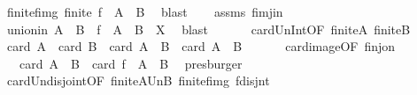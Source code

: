 \begin{isabellebody}
\ finite{\isacharunderscore}{\kern0pt}f{\isacharunderscore}{\kern0pt}img{\isacharcolon}{\kern0pt}\ {\isachardoublequoteopen}finite\ {\isacharparenleft}{\kern0pt}f\ {\isacharbackquote}{\kern0pt}\ {\isacharparenleft}{\kern0pt}A\ {\isasyminter}\ B{\isacharparenright}{\kern0pt}{\isacharparenright}{\kern0pt}{\isachardoublequoteclose}\ \isamarkupfalse%
\ blast\isanewline
\ \ \isamarkupfalse%
\ assms{\isacharparenleft}{\kern0pt}{}{\isacharparenright}{\kern0pt}\ f{\isacharunderscore}{\kern0pt}imj{\isacharunderscore}{\kern0pt}in\ \isamarkupfalse%
\ union{\isacharunderscore}{\kern0pt}in{\isacharcolon}{\kern0pt}\ {\isachardoublequoteopen}{\isacharparenleft}{\kern0pt}A\ {\isasymunion}\ B{\isacharparenright}{\kern0pt}\ {\isasymunion}\ f\ {\isacharbackquote}{\kern0pt}\ {\isacharparenleft}{\kern0pt}A\ {\isasyminter}\ B{\isacharparenright}{\kern0pt}\ {\isasymsubseteq}\ X{\isachardoublequoteclose}\ \isamarkupfalse%
\ blast\isanewline
\ \ \isanewline
\ \ \isamarkupfalse%
\ card{\isacharunderscore}{\kern0pt}Un{\isacharunderscore}{\kern0pt}Int{\isacharbrackleft}{\kern0pt}OF\ finite{\isacharunderscore}{\kern0pt}A\ finite{\isacharunderscore}{\kern0pt}B{\isacharbrackright}{\kern0pt}\ \isamarkupfalse%
\ {\isachardoublequoteopen}card\ A\ {\isacharplus}{\kern0pt}\ card\ B\ {\isacharequal}{\kern0pt}\ card\ {\isacharparenleft}{\kern0pt}A\ {\isasymunion}\ B{\isacharparenright}{\kern0pt}\ {\isacharplus}{\kern0pt}\ card\ {\isacharparenleft}{\kern0pt}A\ {\isasyminter}\ B{\isacharparenright}{\kern0pt}{\isachardoublequoteclose}\ \isacommand{{\isachardot}{\kern0pt}}\isamarkupfalse%
\isanewline
\ \ \isamarkupfalse%
\ \isamarkupfalse%
\ card{\isacharunderscore}{\kern0pt}image{\isacharbrackleft}{\kern0pt}OF\ f{\isacharunderscore}{\kern0pt}inj{\isacharunderscore}{\kern0pt}on{\isacharbrackright}{\kern0pt}\ \isamarkupfalse%
\ {\isachardoublequoteopen}{\isachardot}{\kern0pt}{\isachardot}{\kern0pt}{\isachardot}{\kern0pt}\ {\isacharequal}{\kern0pt}\ card\ {\isacharparenleft}{\kern0pt}A\ {\isasymunion}\ B{\isacharparenright}{\kern0pt}\ {\isacharplus}{\kern0pt}\ card\ {\isacharparenleft}{\kern0pt}f\ {\isacharbackquote}{\kern0pt}\ {\isacharparenleft}{\kern0pt}A\ {\isasyminter}\ B{\isacharparenright}{\kern0pt}{\isacharparenright}{\kern0pt}{\isachardoublequoteclose}\ \isamarkupfalse%
\ presburger\isanewline
\ \ \isamarkupfalse%
\ \isamarkupfalse%
\ card{\isacharunderscore}{\kern0pt}Un{\isacharunderscore}{\kern0pt}disjoint{\isacharbrackleft}{\kern0pt}OF\ finite{\isacharunderscore}{\kern0pt}A{\isacharunderscore}{\kern0pt}Un{\isacharunderscore}{\kern0pt}B\ finite{\isacharunderscore}{\kern0pt}f{\isacharunderscore}{\kern0pt}img\ f{\isacharunderscore}{\kern0pt}disjnt{\isacharbrackright}{\kern0pt}\ \isamarkupfalse%

\end{isabellebody}
